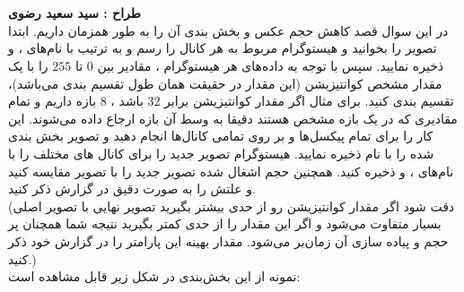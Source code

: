 \documentclass[a4paper]{article}
\begin{document}
\section{}
\textbf{طراح :‌ سید سعید رضوی}
\vspace{0.5cm}
\\
در این سوال قصد کاهش حجم عکس
و بخش بندی 
آن را به طور همزمان داریم.
ابتدا تصویر
 را بخوانید  و هیستوگرام مربوط به هر کانال را رسم  و به ترتیب با نام‌های 
،
و
 ذخیره نمایید. سپس با توجه به داده‌های هر هیستوگرام ، مقادیر بین $ 0 $ تا $ 255  $ را با یک مقدار مشخص کوانتیزیشن (این مقدار در حقیقت همان طول تقسیم بندی می‌باشد)، تقسیم بندی 
 کنید. برای مثال اگر مقدار کوانتیزیشن برابر $ 32 $ باشد ، $ 8 $ بازه داریم و تمام مقادیری که در یک بازه مشخص هستند دقیقا به وسط آن بازه ارجاع داده  می‌شوند. این کار را برای تمام پیکسل‌ها و بر روی تمامی کانال‌ها انجام دهید و تصویر بخش بندی شده را با نام
ذخیره نمایید.  هیستوگرام تصویر جدید را برای کانال های مختلف را با نام‌های
،
و
ذخیره کنید. همچنین حجم اشغال شده تصویر جدید را با تصویر
مقایسه کنید و علتش را به صورت دقیق در گزارش ذکر کنید.
\\
(دقت شود اگر مقدار کوانتیزیشن رو از حدی بیشتر بگیرید تصویر نهایی با تصویر اصلی بسیار متفاوت می‌شود و اگر این مقدار را از حدی کمتر بگیرید نتیجه شما همچنان پر حجم  و پیاده سازی آن زمان‌بر می‌شود. مقدار بهینه این پارامتر را در گزارش خود ذکر کنید.)  
\\
نمونه از این بخش‌بندی در شکل زیر قابل مشاهده است: 
\end{document}
